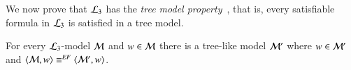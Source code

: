 %

We now prove that $\mathcal{L}_3$ has the \emph{tree model
property}~\cite{BRV01}, that is, every satisfiable formula in
$\mathcal{L}_3$ is satisfied in a tree model.

\begin{thm}\label{prop:tree-model-property}
For every $\mathcal{L}_3$-model
$\mathcal{M}$ and $w\in\mathcal{M}$ there is a tree-like model $\mathcal{M}'$ where
$w\in\mathcal{M}'$ and $\langle \mathcal{M},w \rangle\equiv^{\mathit{EF}}\langle \mathcal{M}',w \rangle$.
\end{thm}

